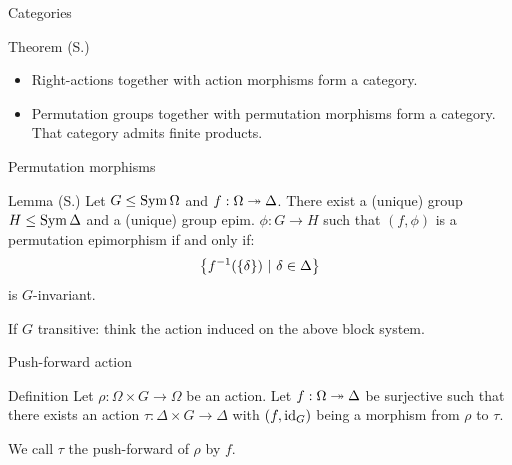 \documentclass{beamer}
\theoremstyle{plain}
\theoremstyle{definition}
\begin{document}
\begin{frame}{Categories}
\begin{block}{Theorem (S.)}
\begin{itemize}
\item Right-actions together with action morphisms form a category.
\item
Permutation groups together with permutation morphisms form a category.
That category admits finite products.
\end{itemize}
\end{block}
\end{frame}


\begin{frame}{Permutation morphisms}
\begin{block}{Lemma (S.)}
Let $G \leq \operatorname{Sym} \Omega$ and $f : \Omega \twoheadrightarrow \Delta$.
There exist a (unique) group $H \leq \operatorname{Sym} \Delta$ and a (unique)
group epim. $\phi : G \to H$ such that
$(f, \phi)$ is a permutation epimorphism
if and only if:
\[
     \left\{  f ^ {-1}( \left\{ \delta \right\} ) ~|~ \delta \in \Delta  \right\} 
\]
is $G$-invariant.
\end{block}


\pause
If $G$ transitive: think the action induced on the above block system.
\end{frame}


%

\begin{frame}{Push-forward action}
\begin{block}{Definition}
Let $\rho : \Omega \times G \to \Omega$ be an action.
Let $f : \Omega \twoheadrightarrow \Delta$ be surjective such that there exists
an action $\tau : \Delta \times G \to \Delta$ with
$(f, \operatorname{id}_G)$ being a morphism from $\rho$ to $\tau$.

We call $\tau$ the push-forward of $\rho$ by $f$.
\end{block}
\end{frame}
\end{document}
